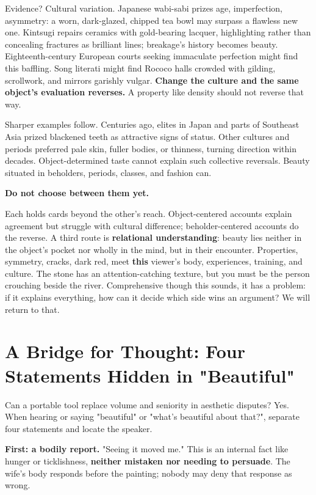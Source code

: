 Evidence? Cultural variation. Japanese wabi-sabi prizes age, imperfection, asymmetry: a worn, dark-glazed, chipped tea bowl may surpass a flawless new one. Kintsugi repairs ceramics with gold-bearing lacquer, highlighting rather than concealing fractures as brilliant lines; breakage's history becomes beauty. Eighteenth-century European courts seeking immaculate perfection might find this baffling. Song literati might find Rococo halls crowded with gilding, scrollwork, and mirrors garishly vulgar. \textbf{Change the culture and the same object's evaluation reverses.} A property like density should not reverse that way.

Sharper examples follow. Centuries ago, elites in Japan and parts of Southeast Asia prized blackened teeth as attractive signs of status. Other cultures and periods preferred pale skin, fuller bodies, or thinness, turning direction within decades. Object-determined taste cannot explain such collective reversals. Beauty situated in beholders, periods, classes, and fashion can.

\textbf{Do not choose between them yet.}

Each holds cards beyond the other's reach. Object-centered accounts explain agreement but struggle with cultural difference; beholder-centered accounts do the reverse. A third route is \textbf{relational understanding}: beauty lies neither in the object's pocket nor wholly in the mind, but in their encounter. Properties, symmetry, cracks, dark red, meet \textbf{this} viewer's body, experiences, training, and culture. The stone has an attention-catching texture, but you must be the person crouching beside the river. Comprehensive though this sounds, it has a problem: if it explains everything, how can it decide which side wins an argument? We will return to that.

\section{A Bridge for Thought: Four Statements Hidden in "Beautiful"}
Can a portable tool replace volume and seniority in aesthetic disputes? Yes. When hearing or saying "beautiful" or "what's beautiful about that?", separate four statements and locate the speaker.

\textbf{First: a bodily report.} "Seeing it moved me." This is an internal fact like hunger or ticklishness, \textbf{neither mistaken nor needing to persuade}. The wife's body responds before the painting; nobody may deny that response as wrong.

